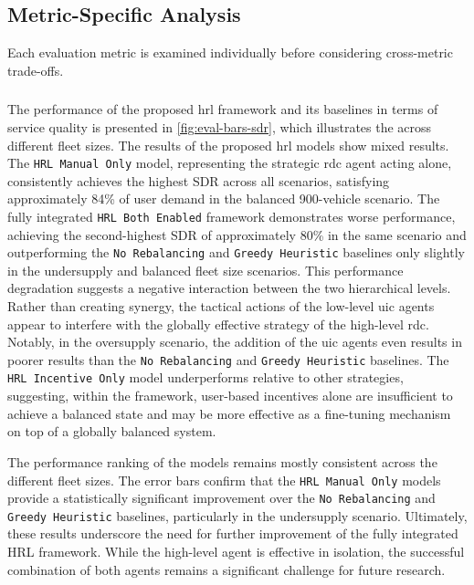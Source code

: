 \subsection{Metric-Specific Analysis}
Each evaluation metric is examined individually before considering cross-metric trade-offs.


\subsubsection{}
The performance of the proposed \gls{hrl} framework and its baselines in terms of service quality is presented in \autoref{fig:eval-bars-sdr}, which illustrates the  across different fleet sizes.
The results of the proposed \gls{hrl} models show mixed results.
The \texttt{HRL Manual Only} model, representing the strategic \gls{rdc} agent acting alone, consistently achieves the highest SDR across all scenarios, satisfying approximately 84\% of user demand in the balanced 900-vehicle scenario.
The fully integrated \texttt{HRL Both Enabled} framework demonstrates worse performance, achieving the second-highest SDR of approximately 80\% in the same scenario and outperforming the \texttt{No Rebalancing} and \texttt{Greedy Heuristic} baselines only slightly in the undersupply and balanced fleet size scenarios.
This performance degradation suggests a negative interaction between the two hierarchical levels.
Rather than creating synergy, the tactical actions of the low-level \gls{uic} agents appear to interfere with the globally effective strategy of the high-level \gls{rdc}.
Notably, in the oversupply scenario, the addition of the \gls{uic} agents even results in poorer results than the \texttt{No Rebalancing} and \texttt{Greedy Heuristic} baselines.
The \texttt{HRL Incentive Only} model underperforms relative to other strategies, suggesting, within the framework, user-based incentives alone are insufficient to achieve a balanced state and may be more effective as a fine-tuning mechanism on top of a globally balanced system.

The performance ranking of the models remains mostly consistent across the different fleet sizes.
The error bars confirm that the \texttt{HRL Manual Only} models provide a statistically significant improvement over the \texttt{No Rebalancing} and \texttt{Greedy Heuristic} baselines, particularly in the undersupply scenario.
Ultimately, these results underscore the need for further improvement of the fully integrated HRL framework.
While the high-level agent is effective in isolation, the successful combination of both agents remains a significant challenge for future research.

